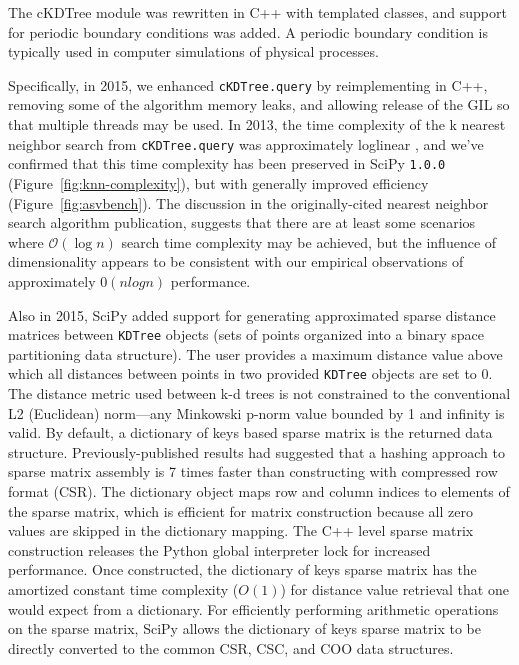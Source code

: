 The cKDTree module was rewritten in C++ with templated classes, and support for
periodic boundary conditions was added. A periodic boundary condition is typically 
used in computer simulations of physical processes.

Specifically, in 2015, we enhanced \texttt{cKDTree.query} by reimplementing in C++,
removing some of the algorithm memory leaks, and allowing 
release of the GIL so that multiple threads may be used\cite{gh-4374}. In 2013,
the time complexity of the k nearest neighbor search from \texttt{cKDTree.query}
was approximately loglinear \cite{knn-jake}, and we've confirmed that this time
complexity has been preserved in SciPy \texttt{1.0.0} (Figure~\ref{fig:knn-complexity}),
but with generally improved efficiency (Figure~\ref{fig:asvbench}). The
discussion in the originally-cited nearest neighbor search
algorithm publication\cite{kdtree-search-algo}, suggests that there are
at least some scenarios where $\mathcal{O}(\log{n})$ search time complexity may
be achieved, but the influence of dimensionality appears to be consistent
with our empirical observations of approximately $0(n log n)$ performance.

Also in 2015, SciPy added support for generating approximated sparse distance matrices 
between \texttt{KDTree} objects (sets of points organized into a binary space 
partitioning data structure\cite{Bentley:1975:MBS:361002.361007}). 
The user provides a maximum distance value
above which all distances between points in two provided \texttt{KDTree} objects
are set to 0. The distance metric used between k-d trees is not constrained
to the conventional L2 (Euclidean) norm---any Minkowski p-norm value
bounded by 1 and infinity is valid. By default, a dictionary of keys
based sparse matrix is the returned data structure. Previously-published
results had suggested that a hashing approach to sparse matrix assembly
is 7 times faster than constructing with compressed row format (CSR)\cite{10.1007/978-3-540-75755-9_107}.
The dictionary object maps row and column indices to elements of the sparse matrix, which is
efficient for matrix construction because all zero values are skipped in
the dictionary mapping. The C++ level sparse matrix construction releases the Python
global interpreter lock for increased performance. Once constructed, the
dictionary of keys sparse matrix has the amortized constant time complexity 
($O(1)$) for distance value retrieval that one would expect from a 
dictionary\cite{Cormen:2001:IA:580470}. For efficiently performing arithmetic
operations on the sparse matrix, SciPy allows the dictionary of keys
sparse matrix to be directly converted to the common CSR, CSC, and COO
data structures.

